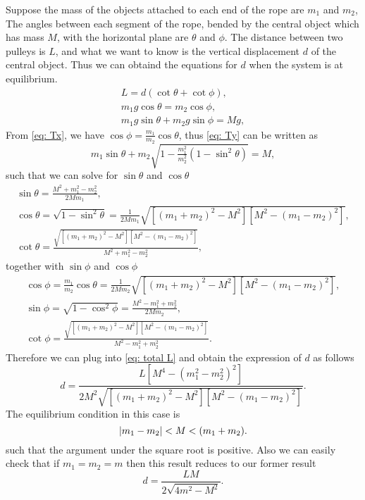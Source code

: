 \documentclass[10pt]{article}
\begin{document}
	Suppose the mass of the objects attached to each end of the rope are $m_1$ and $m_2$, The angles between each segment of the rope, bended by the central object which has mass $M$, with the horizontal plane are $\theta$ and $\phi$. The distance between two pulleys is $L$, and what we want to know is the vertical displacement $d$ of the central object. Thus we can obtaind the equations for $d$ when the system is at equilibrium.
	\begin{gather}
		L = d (\cot \theta + \cot \phi), \label{eq: total L}\\
		m_1 g \cos \theta = m_2 \cos \phi, \label{eq: Tx}\\
		m_1 g \sin \theta + m_2 g \sin \phi = Mg, \label{eq: Ty}
	\end{gather}
	From \eqref{eq: Tx}, we have $\cos \phi = \tfrac{m_1}{m_2} \cos \theta$, thus \eqref{eq: Ty} can be written as
	\begin{equation}
		m_1 \sin \theta + m_2 \sqrt{1 - \tfrac{m_1^2}{m_2^2}(1- \sin^2 \theta)} = M,
	\end{equation}
	such that we can solve for $\sin \theta$ and $\cos \theta$
	\begin{gather}
		\sin \theta = \frac{M^2 + m_1^2 - m_2^2}{2 M m_1}, \\
		\cos \theta = \sqrt{1 - \sin^2 \theta} = \frac{1}{2 M m_1} \sqrt{[(m_1 + m_2)^2 - M^2][M^2 - (m_1 - m_2)^2]}, \\
		\cot \theta = \frac{\sqrt{[(m_1 + m_2)^2 - M^2][M^2 - (m_1 - m_2)^2]}}{M^2 + m_1^2 - m_2^2},
	\end{gather}
	together with $\sin \phi$ and $\cos \phi$
	\begin{gather}
		\cos \phi = \frac{m_1}{m_2} \cos \theta = \frac{1}{2 M m_2} \sqrt{[(m_1 + m_2)^2 - M^2][M^2 - (m_1 - m_2)^2]}, \\
		\sin \phi = \sqrt{1 - \cos^2 \phi} = \frac{M^2 - m_1^2 + m_2^2}{2M m_2}, \\
		\cot \phi = \frac{\sqrt{[(m_1 + m_2)^2 - M^2][M^2 - (m_1 - m_2)^2]}}{M^2 - m_1^2 + m_2^2}.
	\end{gather}
	Therefore we can plug into \eqref{eq: total L} and obtain the expression of $d$ as follows
	\begin{equation}
		d = \frac{L[M^4 - (m_1^2 - m_2^2)^2]}{2M^2 \sqrt{[(m_1 + m_2)^2 - M^2][M^2 - (m_1 - m_2)^2]}}.
	\end{equation}
	The equilibrium condition in this case is
	\begin{equation}
		\abs{m_1 - m_2} < M < (m_1 + m_2).
	\end{equation}
	such that the argument under the square root is positive. Also we can easily check that if $m_1 = m_2 = m$ then this result reduces to our former result
	\begin{equation}
		d = \frac{L M}{2\sqrt{4m^2 - M^2}}.
	\end{equation}
\end{document}
